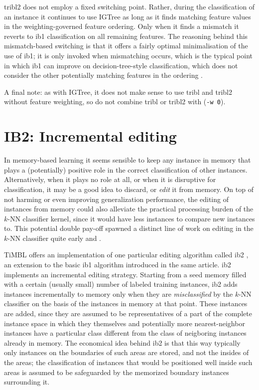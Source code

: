 \documentclass{book}
\begin{document}
{\sc tribl2} does not employ a fixed switching point. Rather, during
the classification of an instance it continues to use {\sc IGTree} as
long as it finds matching feature values in the weighting-governed
feature ordering. Only when it finds a mismatch it reverts to {\sc
ib1} classification on all remaining features. The reasoning behind
this mismatch-based switching is that it offers a fairly optimal
minimalisation of the use of {\sc ib1}; it is only invoked when
mismatching occurs, which is the typical point in which {\sc ib1} can
improve on decision-tree-style classification, which does not consider
the other potentially matching features in the ordering
\cite{Daelemans+99}.

A final note: as with {\sc IGTree}, it does not make sense to use {\sc
  tribl} and {\sc tribl2} without feature weighting, so do not combine
{\sc tribl} or {\sc tribl2} with ({\tt -w 0}).

\section{IB2: Incremental editing}
\label{ib2}

In memory-based learning it seems sensible to keep any instance in
memory that plays a (potentially) positive role in the correct
classification of other instances. Alternatively, when it plays no
role at all, or when it is disruptive for classification, it may be a
good idea to discard, or {\em edit} it from memory. On top of not
harming or even improving generalization performance, the editing of
instances from memory could also alleviate the practical processing
burden of the $k$-NN classifier kernel, since it would have less
instances to compare new instances to. This potential double pay-off
spawned a distinct line of work on editing in the $k$-NN classifier
quite early  and .

TiMBL offers an implementation of one particular editing algorithm
called {\sc ib2} \cite{Aha+91}, an extension to the basic {\sc ib1}
algorithm introduced in the same article. {\sc ib2} implements an
incremental editing strategy. Starting from a seed memory filled with
a certain (usually small) number of labeled training instances, {\sc
ib2} adds instances incrementally to memory only when they are {\em
misclassified}\/ by the $k$-NN classifier on the basis of the
instances in memory at that point. These instances are added, since
they are assumed to be representatives of a part of the complete
instance space in which they themselves and potentially more
nearest-neighbor instances have a particular class different from the
class of neigboring instances already in memory. The economical idea
behind {\sc ib2} is that this way typically only instances on the
boundaries of such areas are stored, and not the insides of the areas;
the classification of instances that would be positioned well inside
such areas is assumed to be safeguarded by the memorized boundary
instances surrounding it.
\end{document}
